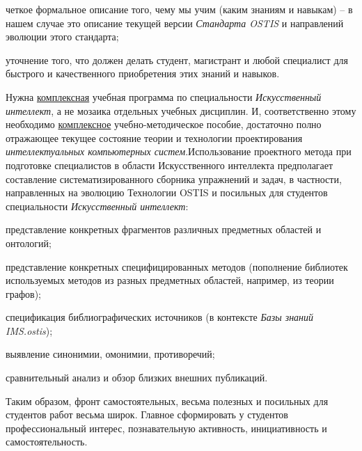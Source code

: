 {    \begin{scnitemize}
        \item четкое формальное описание того, чему мы учим (каким знаниям и навыкам) -- в нашем случае это описание текущей версии \textit{Стандарта OSTIS} и направлений эволюции этого стандарта;
        \item уточнение того, что должен делать студент, магистрант и любой специалист для быстрого и качественного приобретения этих знаний и навыков.
    \end{scnitemize}
    Нужна \uline{комплексная} учебная программа по специальности \textit{Искусственный интеллект}, а не мозаика отдельных учебных дисциплин. И, соответственно этому необходимо \uline{комплексное} учебно-методическое пособие, достаточно полно отражающее текущее состояние теории и технологии проектирования \textit{интеллектуальных компьютерных систем}.Использование проектного метода при подготовке специалистов в области Искусственного интеллекта предполагает составление систематизированного сборника упражнений и задач, в частности, направленных на эволюцию Технологии OSTIS и посильных для студентов специальности \textit{Искусственный интеллект}:
    \begin{scnitemize}
        \item представление конкретных фрагментов различных предметных областей и онтологий;
        \item представление конкретных специфицированных методов (пополнение библиотек используемых методов из разных предметных областей, например, из теории графов);
        \item спецификация библиографических источников (в контексте \textit{Базы знаний IMS.ostis});
        \item выявление синонимии, омонимии, противоречий;
        \item сравнительный анализ и обзор близких внешних публикаций.
    \end{scnitemize}
    Таким образом, фронт самостоятельных, весьма полезных и посильных для студентов работ весьма широк. Главное сформировать у студентов профессиональный интерес, познавательную активность, инициативность и самостоятельность.}
